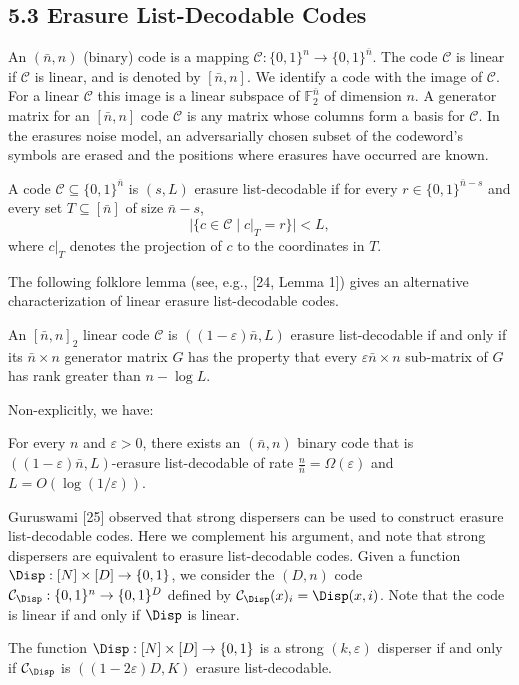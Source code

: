 \subsection*{5.3 Erasure List-Decodable Codes}
An $(\bar n,n)$ (binary) code is a mapping $\mathcal C:\{0,1\}^n\to\{0,1\}^{\bar n}$. The code $\mathcal C$ is linear if $\mathcal C$ is linear, and is denoted by $[\bar n,n]$. We identify a code with the image of $\mathcal C$. For a linear $\mathcal C$ this image is a linear subspace of $\mathbb F_2^{\bar n}$ of dimension $n$. A generator matrix for an $[\bar n,n]$ code $\mathcal C$ is any matrix whose columns form a basis for $\mathcal C$. In the erasures noise model, an adversarially chosen subset of the codeword's symbols are erased and the positions where erasures have occurred are known.
\begin{definition}
A code $\mathcal C\subseteq\{0,1\}^{\bar n}$ is $(s,L)$ erasure list-decodable if for every $r\in\{0,1\}^{\bar n-s}$ and every set $T\subseteq[\bar n]$ of size $\bar n-s$,
\[|\{c\in\mathcal C\mid c|_T=r\}|<L,\]
where $c|_T$ denotes the projection of $c$ to the coordinates in $T$.
\end{definition}
The following folklore lemma (see, e.g., [24, Lemma 1]) gives an alternative characterization of linear erasure list-decodable codes.
\begin{lemma}
An $[\bar n,n]_2$ linear code $\mathcal C$ is $((1-\varepsilon)\bar n,L)$ erasure list-decodable if and only if its $\bar n\times n$ generator matrix $G$ has the property that every $\varepsilon\bar n\times n$ sub-matrix of $G$ has rank greater than $n-\log L$.
\end{lemma}
Non-explicitly, we have:
\begin{theorem}[{[24]}]
For every $n$ and $\varepsilon>0$, there exists an $(\bar n,n)$ binary code that is $((1-\varepsilon)\bar n,L)$-erasure list-decodable of rate $\frac n{\bar n}=\Omega(\varepsilon)$ and $L=O(\log(1/\varepsilon))$.
\end{theorem}
Guruswami [25] observed that strong dispersers can be used to construct erasure list-decodable codes. Here we complement his argument, and note that strong dispersers are equivalent to erasure list-decodable codes. Given a function $\Disp:[N]\times[D]\to\{0,1\}$, we consider the $(D,n)$ code $\mathcal C_{\Disp}:\{0,1\}^n\to\{0,1\}^D$ defined by $\mathcal C_{\Disp}(x)_i=\Disp(x,i)$. Note that the code is linear if and only if $\Disp$ is linear.
\begin{lemma}[following {[25, Lemma 12]}]
The function $\Disp:[N]\times[D]\to\{0,1\}$ is a strong $(k,\varepsilon)$ disperser if and only if $\mathcal C_{\Disp}$ is $((1-2\varepsilon)D,K)$ erasure list-decodable.
\end{lemma}

